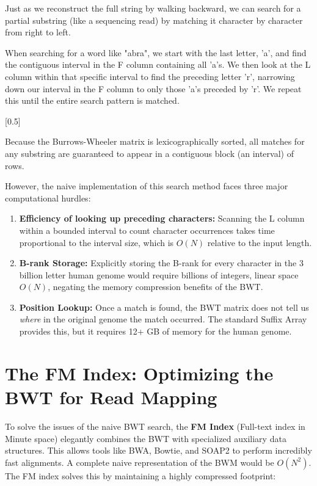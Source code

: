 Just as we reconstruct the full string by walking backward, we can search for a partial substring (like a sequencing read) by matching it character by character from right to left.

When searching for a word like "abra", we start with the last letter, 'a', and find the contiguous interval in the F column containing all 'a's. We then look at the L column within that specific interval to find the preceding letter 'r', narrowing down our interval in the F column to only those 'a's preceded by 'r'. We repeat this until the entire search pattern is matched.

[0.5]

\sta Because the Burrows-Wheeler matrix is lexicographically sorted, all matches for any substring are guaranteed to appear in a contiguous block (an interval) of rows.

However, the naive implementation of this search method faces three major computational hurdles:
\begin{enumerate}
    \item \textbf{Efficiency of looking up preceding characters:} Scanning the L column within a bounded interval to count character occurrences takes time proportional to the interval size, which is $O(N)$ relative to the input length.
    \item \textbf{B-rank Storage:} Explicitly storing the B-rank for every character in the 3 billion letter human genome would require billions of integers, linear space $O(N)$, negating the memory compression benefits of the BWT.
    \item \textbf{Position Lookup:} Once a match is found, the BWT matrix does not tell us \textit{where} in the original genome the match occurred. The standard Suffix Array provides this, but it requires 12+ GB of memory for the human genome.
\end{enumerate}

\section{The FM Index: Optimizing the BWT for Read Mapping}

To solve the issues of the naive BWT search, the \textbf{FM Index} (Full-text index in Minute space) elegantly combines the BWT with specialized auxiliary data structures. This allows tools like BWA, Bowtie, and SOAP2 to perform incredibly fast alignments. A complete naive representation of the BWM would be $O(N^2)$. The FM index solves this by maintaining a highly compressed footprint:


